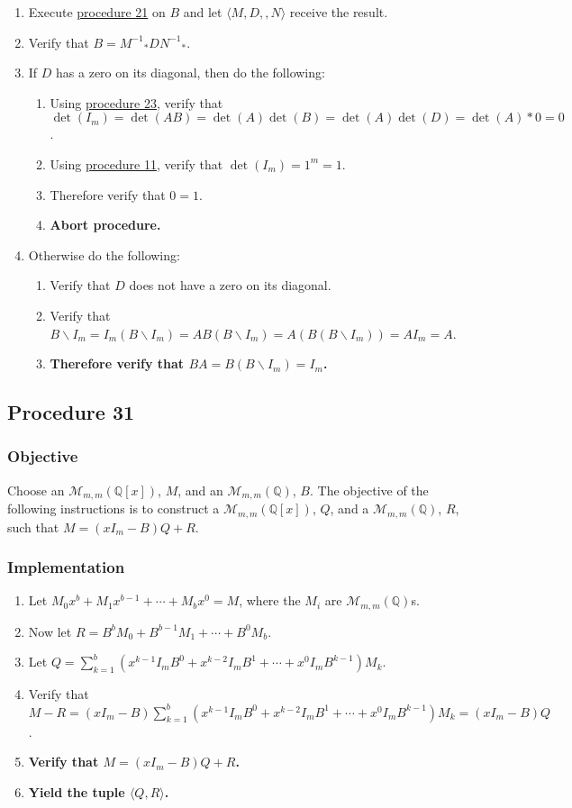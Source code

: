 \documentclass[twocolumn]{article}
\newcommand{\procedure}[2][]{\subsection*{Procedure #2 \ifthenelse{\equal{#1}{}}{}{(#1)}}\label{sec:procedure #2}}
\newcommand{\objective}{\subsubsection*{Objective}}
\newcommand{\implementation}{\subsubsection*{Implementation}}
\begin{document}
				\begin{enumerate}
					\item Execute \hyperref[sec:procedure 21]{procedure 21} on $B$ and let $\langle M,D,,N\rangle$ receive the result.
					\item Verify that $B={M^{-1}}_*D{N^{-1}}_*$.
					\item If $D$ has a zero on its diagonal, then do the following:
					\begin{enumerate}
						\item Using \hyperref[sec:procedure 23]{procedure 23}, verify that $\det(I_m)=\det(AB)=\det(A)\det(B)=\det(A)\det(D)=\det(A)*0=0$.
						\item Using \hyperref[sec:procedure 11]{procedure 11}, verify that $\det(I_m)=1^m=1$.
						\item Therefore verify that $0=1$.
						\item \textbf{Abort procedure.}
					\end{enumerate}
					\item Otherwise do the following:
					\begin{enumerate}
						\item Verify that $D$ does not have a zero on its diagonal.
						\item Verify that $B\backslash I_m=I_m(B\backslash I_m)=AB(B\backslash I_m)=A(B(B\backslash I_m))=AI_m=A$.
						\item \textbf{Therefore verify that $BA=B(B\backslash I_m)=I_m$.}
					\end{enumerate}
				\end{enumerate}
		\procedure{31}
			\objective
				Choose an $\mathcal{M}_{m,m}(\mathbb{Q}[x])$, $M$, and an $\mathcal{M}_{m,m}(\mathbb{Q})$, $B$. The objective of the following instructions is to construct a $\mathcal{M}_{m,m}(\mathbb{Q}[x])$, $Q$, and a $\mathcal{M}_{m,m}(\mathbb{Q})$, $R$, such that $M=(xI_m-B)Q+R$.
			\implementation
				\begin{enumerate}
					\item Let $M_0x^b+M_1x^{b-1}+\cdots+M_bx^0=M$, where the $M_i$ are $\mathcal{M}_{m,m}(\mathbb{Q})$s.
					\item Now let $R=B^bM_0+B^{b-1}M_1+\cdots+B^0M_b$.
					\item Let $Q=\sum_{k=1}^b (x^{k-1}I_mB^0+x^{k-2}I_mB^1+\cdots+x^0I_mB^{k-1})M_k$.
					\item Verify that $M-R=(xI_m-B)\sum_{k=1}^b (x^{k-1}I_mB^0+x^{k-2}I_mB^1+\cdots+x^0I_mB^{k-1})M_k=(xI_m-B)Q$.
					\item \textbf{Verify that $M=(xI_m-B)Q+R$.}
					\item \textbf{Yield the tuple $\langle Q,R\rangle$.}
				\end{enumerate}
\end{document}
